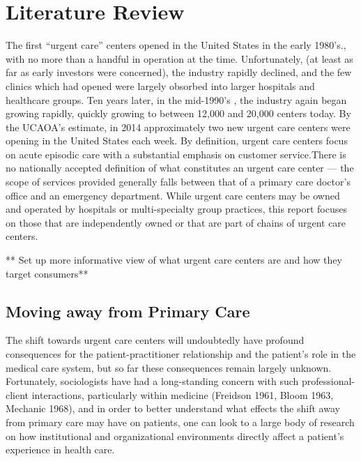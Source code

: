 \documentclass[12pt,twoside]{reedthesis}
\begin{document}
  \doublespacing
  
  \chapter{Literature Review}\label{literature-review}
  
  The first ``urgent care'' centers opened in the United States in the
  early 1980's., with no more than a handful in operation at the time.
  Unfortunately, (at least as far as early investors were concerned), the
  industry rapidly declined, and the few clinics which had opened were
  largely obsorbed into larger hospitals and healthcare groups. Ten years
  later, in the mid-1990's , the industry again began growing rapidly,
  quickly growing to between 12,000 and 20,000 centers today. By the
  UCAOA's estimate, in 2014 approximately two new urgent care centers were
  opening in the United States each week. By definition, urgent care
  centers focus on acute episodic care with a substantial emphasis on
  customer service.There is no nationally accepted definition of what
  constitutes an urgent care center --- the scope of services provided
  generally falls between that of a primary care doctor's office and an
  emergency department. While urgent care centers may be owned and
  operated by hospitals or multi-specialty group practices, this report
  focuses on those that are independently owned or that are part of chains
  of urgent care centers.
  
  ** Set up more informative view of what urgent care centers are and how
  they target consumers**
  
  \section{Moving away from Primary
  Care}\label{moving-away-from-primary-care}
  
  The shift towards urgent care centers will undoubtedly have profound
  consequences for the patient-practitioner relationship and the patient's
  role in the medical care system, but so far these consequences remain
  largely unknown. Fortunately, sociologists have had a long-standing
  concern with such professional-client interactions, particularly within
  medicine (Freidson 1961, Bloom 1963, Mechanic 1968), and in order to
  better understand what effects the shift away from primary care may have
  on patients, one can look to a large body of research on how
  institutional and organizational environments directly affect a
  patient's experience in health care.
  
\end{document}
